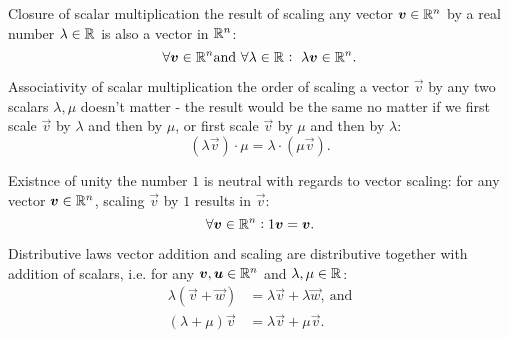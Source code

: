 \begin{descitemize}
\item[Closure of scalar multiplication] the result of scaling any vector $\vec{v}\in\Rs[n]$ by a real number $\lambda\in\Rs$ is also a vector in $\Rs[n]$:
    \begin{equation}
        \forall\vec{v}\in\Rs[n] \text{and}\ \forall\lambda\in\Rs:\ \lambda\vec{v}\in\Rs[n].
        \label{eq:scalar_multiplication_closure}
    \end{equation}

\item[Associativity of scalar multiplication] the order of scaling a vector $\vec{v}$ by any two scalars $\lambda,\mu$ doesn't matter - the result would be the same no matter if we first scale $\vec{v}$ by $\lambda$ and then by $\mu$, or first scale $\vec{v}$ by $\mu$ and then by $\lambda$:
    \begin{equation}
        \left(\lambda\vec{v}\right)\cdot\mu = \lambda\cdot\left(\mu\vec{v}\right).
        \label{eq:scalar_multiplication_associative}
    \end{equation}

    \item[Existnce of unity] the number $1$ is neutral with regards to vector scaling: for any vector $\vec{v}\in\Rs[n]$, scaling $\vec{v}$ by $1$ results in $\vec{v}$:
        \begin{equation}
            \forall \vec{v}\in\Rs[n]: 1\vec{v}=\vec{v}.
            \label{eq:scalar_multiplication_unity}
        \end{equation}

    \item[Distributive laws] vector addition and scaling are distributive together with addition of scalars, i.e. for any $\vec{v},\vec{u}\in\Rs[n]$ and $\lambda,\mu\in\Rs$:
        \begin{align}
            \lambda\left(\vec{v}+\vec{w}\right) &= \lambda\vec{v} + \lambda\vec{w},\ \text{and}\\ \left(\lambda+\mu\right)\vec{v} &= \lambda\vec{v} + \mu\vec{v}.
            \label{eq:label}
        \end{align}
\end{descitemize}



